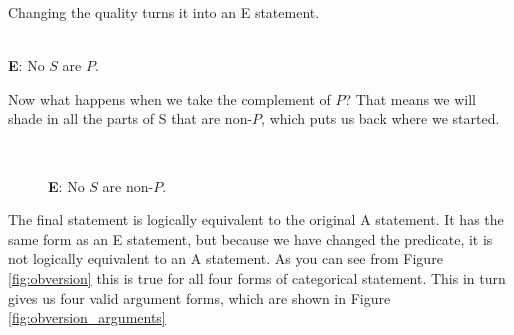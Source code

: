 Changing the quality turns it into an E statement.

\begin{center}
 \\
\textbf{E}: No $S$ are $P$.
\end{center}

Now what happens when we take the complement of $P$? That means we will shade in all the parts of S that are non-$P$, which puts us back where we started.


\begin{figure}[H]
\begin{center}
 \\
\captionsetup{singlelinecheck=on}
\caption*{\textbf{E}: No $S$ are non-$P$.}
\end{center}
\end{figure}

The final statement is logically equivalent to the original A statement. It has the same form as an E statement, but because we have changed the predicate, it is not logically equivalent to an A statement. As you can see from Figure \ref{fig:obversion} this is true for all four forms of categorical statement. 
This in turn gives us four valid argument forms, which are shown in Figure \ref{fig:obversion_arguments}

